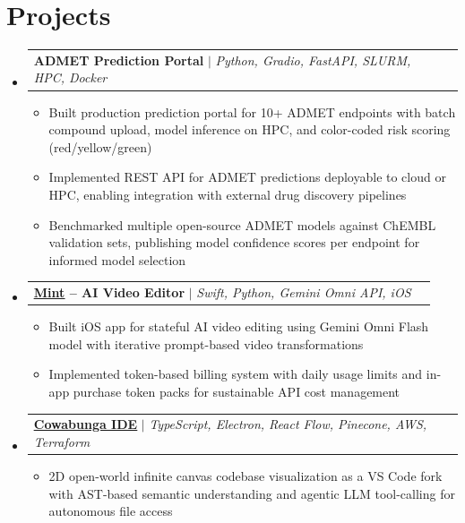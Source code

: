 \documentclass[letterpaper,11pt]{article}
\makeatletter
\newcommand{\resumeItem}[1]{
  \item\small{
    {#1 \vspace{-2pt}}
  }
}
\newcommand{\resumeProjectHeading}[2]{
    \item
    \begin{tabular*}{0.97\textwidth}{l@{\extracolsep{\fill}}r}
      \small#1 & #2 \\
    \end{tabular*}\vspace{-7pt}
}
\newcommand{\resumeSubHeadingListStart}{\begin{itemize}[leftmargin=0.15in, label={}]}
\newcommand{\resumeSubHeadingListEnd}{\end{itemize}}
\newcommand{\resumeItemListStart}{\begin{itemize}}
\newcommand{\resumeItemListEnd}{\end{itemize}\vspace{-5pt}}
\makeatother
\begin{document}
\section{Projects}
    \resumeSubHeadingListStart
        \resumeProjectHeading
          {\textbf{ADMET Prediction Portal}
          $|$ \emph{Python, Gradio, FastAPI, SLURM, HPC, Docker}}{}
          \resumeItemListStart
            \resumeItem{Built production prediction portal for 10+ ADMET endpoints with batch compound upload, model inference on HPC, and color-coded risk scoring (red/yellow/green)}
            \resumeItem{Implemented REST API for ADMET predictions deployable to cloud or HPC, enabling integration with external drug discovery pipelines}
            \resumeItem{Benchmarked multiple open-source ADMET models against ChEMBL validation sets, publishing model confidence scores per endpoint for informed model selection}
          \resumeItemListEnd
        \resumeProjectHeading
          {\textbf{\href{https://mintedai.app/}{\underline{Mint}} -- AI Video Editor}
          $|$ \emph{Swift, Python, Gemini Omni API, iOS}}{}
          \resumeItemListStart
            \resumeItem{Built iOS app for stateful AI video editing using Gemini Omni Flash model with iterative prompt-based video transformations}
            \resumeItem{Implemented token-based billing system with daily usage limits and in-app purchase token packs for sustainable API cost management}
          \resumeItemListEnd
        \resumeProjectHeading
          {\textbf{\href{https://www.linkedin.com/feed/update/urn:li:activity:7358759350032617473/}{\underline{Cowabunga IDE}}}
          $|$ \emph{TypeScript, Electron, React Flow, Pinecone, AWS, Terraform}}{}
          \resumeItemListStart
            \resumeItem{2D open-world infinite canvas codebase visualization as a VS Code fork with AST-based semantic understanding and agentic LLM tool-calling for autonomous file access}
          \resumeItemListEnd
    \resumeSubHeadingListEnd
\end{document}
